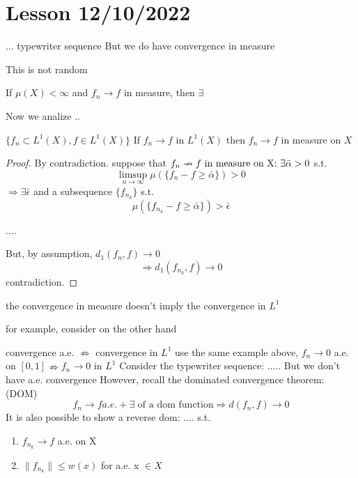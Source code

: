\section*{Lesson 12/10/2022}
... typewriter sequence
But we do have convergence in measure

\begin{remark}
    \( f_p \nrightarrow 0 $ a.e. on [0, 1]
    But consider \( \{ f_{p(n,1)}: n \in \mathbb{N} \} \). This is a subsequence and, by def \[  \] 
    For this subsequence, we have $f_{p(n,1)}(x) \rightarrow 0 \) as \( n \to\infty \ \forall x \in (0, 1] \)
    ..
    
\end{remark}
This is not random

\begin{proposition}
    If \(\mu(X) < \infty \) and \(f_n \rightarrow f \) in measure, then \(\exists\)
\end{proposition}
Now we analize ..
\begin{theorem}
    \( \{f_n \subset L^1(X), f \in L^1(X)\} \) If \(f_n \rightarrow f \) in \(L^1(X)\) then \(f_n \rightarrow f \) in measure on \(X\)
\end{theorem}
\begin{proof}
    By contradiction.
    suppose that \(f_n \nrightarrow f $ in measure on X: $\exists \bar{\alpha} >0 \) s.t. 
    \[ \limsup_{n\to\infty} \mu(\{ f_n-f \geq \bar{\alpha} \}) >0  \]
    \(\Rightarrow \exists \bar{\epsilon}\) and a subsequence \( \{ f_{n_k} \} \) s.t.
    \[ \mu(\{ f_{n_k}-f \geq \bar{\alpha} \}) > \bar{\epsilon}  \]

    ....

    But, by assumption, \(d_1(f_n, f) \rightarrow 0\)
    \[ \Rightarrow d_1(f_{n_k}, f) \rightarrow 0 \] 
    contradiction.
\end{proof}

\begin{remark}
    the convergence in measure doesn't imply the convergence in $L^1$
\end{remark}
for example, consider 
on the other hand

convergence a.e. \(\nRightarrow\) convergence in \(L^1\)
use the same example above, \(f_n \rightarrow 0\) a.e. on \([0, 1] \nRightarrow f_n \rightarrow 0\) in \(L^1\)
Consider the typewriter sequence: .....
But we don't have a.e. convergence 
However, recall the dominated convergence theorem: (DOM)
\[ f_n \rightarrow f a.e. + \exists \text{ of a dom function} \Rightarrow d(f_n, f)\rightarrow 0 \]
It is also possible to show a reverse dom:
.... s.t. 
\begin{enumerate}
    \item \(f_{n_k} \rightarrow f\) a.e. on X
    \item \(\| f_{n_k} \| \leq w(x) \) for a.e. x \(\in X\)
\end{enumerate}

